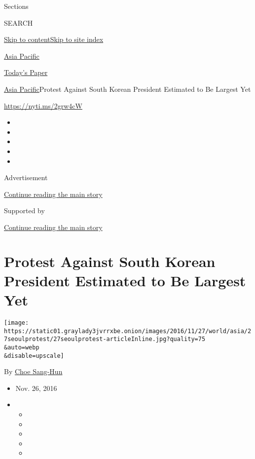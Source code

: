 Sections

SEARCH

\protect\hyperlink{site-content}{Skip to
content}\protect\hyperlink{site-index}{Skip to site index}

\href{https://www.nytimes3xbfgragh.onion/section/world/asia}{Asia
Pacific}

\href{https://myaccount.nytimes3xbfgragh.onion/auth/login?response_type=cookie\&client_id=vi}{}

\href{https://www.nytimes3xbfgragh.onion/section/todayspaper}{Today's
Paper}

\href{/section/world/asia}{Asia Pacific}\textbar{}Protest Against South
Korean President Estimated to Be Largest Yet

\url{https://nyti.ms/2grw4cW}

\begin{itemize}
\item
\item
\item
\item
\item
\end{itemize}

Advertisement

\protect\hyperlink{after-top}{Continue reading the main story}

Supported by

\protect\hyperlink{after-sponsor}{Continue reading the main story}

\hypertarget{protest-against-south-korean-president-estimated-to-be-largest-yet}{%
\section{Protest Against South Korean President Estimated to Be Largest
Yet}\label{protest-against-south-korean-president-estimated-to-be-largest-yet}}

\texttt{[image: https://static01.graylady3jvrrxbe.onion/images/2016/11/27/world/asia/27seoulprotest/27seoulprotest-articleInline.jpg?quality=75\\\&auto=webp\\\&disable=upscale]}

By \href{http://www.nytimes3xbfgragh.onion/by/choe-sang-hun}{Choe
Sang-Hun}

\begin{itemize}
\item
  Nov. 26, 2016
\item
  \begin{itemize}
  \item
  \item
  \item
  \item
  \item
  \end{itemize}
\end{itemize}

